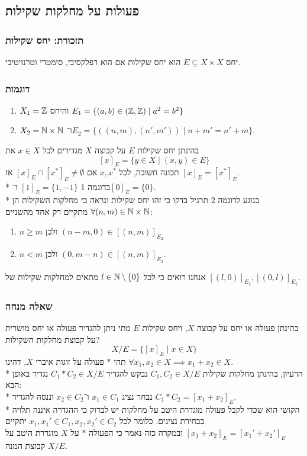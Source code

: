 \subsection{פעולות על מחלקות שקילות}
\subsubsection{תזכורת: יחס שקילות}
יחס $E \subseteq X \times X$ הוא יחס שקילות אם הוא רפלקסיבי, סימטרי וטרנזיטיבי.

\subsubsection{דוגמות}
\begin{enumerate}
	\item $X_1 = \mathbb{Z}$ והיחס $E_1 = \{ (a, b) \in (\mathbb{Z}, \mathbb{Z}) \mid a^2 = b^2 \}$
	\item $X_2 = \mathbb{N} \times \mathbb{N}$ ו־$E_2 = \{ ((n, m), (n', m')) \mid n + m' = n' + m \}$.
\end{enumerate}

בהינתן יחס שקילות $E$ על קבוצה $X$ מגדירים לכל $x \in X$ את
\[
	{[x]}_E = \{ y \in X \mid (x, y) \in E\}
\]
תכונה חשובה, לכל $x, x^*$ אם ${[x]}_E \cap {[x^*]}_E \ne \emptyset$ אז ${[x]}_E ={[x^*]}_E$. \\*
בדוגמה 1 ${[1]}_E = \{1, -1 \}$ ו־${[0]}_E = \{ 0 \}$. \\*
בנוגע לדוגמה 2 תרגיל בדקו כי זהו יחס שקילות ונראה כי מחלקות השקילות הן $\forall (n, m) \in \mathbb{N} \times \mathbb{N}$
מתקיים רק אחד מהשניים:
\begin{enumerate}
	\item $n \ge m$ ולכן $(n - m, 0) \in {[(n, m)]}_{E_2}$
	\item $n < m$ ולכן $(0, m - n) \in {[(n, m)]}_{E_2}$.
\end{enumerate}
אנחנו רואים כי לכל $l \in \mathbb{N} \setminus \{0\}$ מתאים למחלקות שקילות של ${[(l, 0)]}_{E_2}, {[(0, l)]}_{E_2}$.

\subsubsection{שאלה מנחה}
בהינתן פעולה או יחס על קבוצה $X$, ויחס שקילות $E$ מתי ניתן להגדיר פעולה או יחס מושרית על קבוצת מחלקות השקילות?
\[
	X / E = \{ {[x]}_E \mid x \in X\}
\]
תהי $*$ פעולה על זוגות איברי $X$, דהינו $\forall x_1, x_2 \in X \implies x_1 + x_2 \in X$.\\*
הרעיון, בהינתן מחלקות שקילות $C_1, C_2 \in X/E$ נבקש להגדיר $C_1 * C_2 \in X/E$ נגדיר באופן הבא: \\*
נבחר נציג $x_1 \in C_1$ ו־$x_2 \in C_2$ וננסה להגדיר $C_1 * C_2 = {[x_1 + x_2]}_E$. \\*
הקושי הוא שכדי לקבל פעולה מוגדרת היטב על מחלקות יש לבדוק כי ההגדרה איננה תלויה בבחירת נציגים.
כלומר לכל $x_1, x_1' \in C_1, x_2, x_2' \in C_2$ יתקיים ${[x_1 + x_2]}_E = {[x_1' + x_2']}_E$ ובמקרה כזה נאמר כי הפעולה $*$ על $X$ מוגדרת היטב על קבוצת המנה $X/E$.


